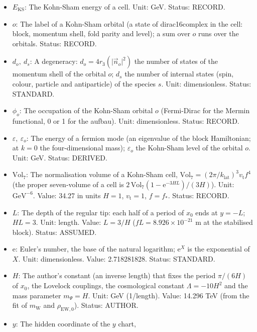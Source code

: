 \documentclass[
  10pt,
]{article}
\providecommand{\tightlist}{%
  \setlength{\itemsep}{0pt}\setlength{\parskip}{0pt}}
\begin{document}
\begin{itemize}
\tightlist
\item
  \(E_{\mathrm{KS}}\): The Kohn-Sham energy of a cell. Unit: GeV.
  Status: RECORD.
\item
  \(o\): The label of a Kohn-Sham orbital (a state of dirac16complex in
  the cell: block, momentum shell, fold parity and level); a sum over
  \(o\) runs over the orbitals. Status: RECORD.
\item
  \(d_o,\ d_s\): A degeneracy: \(d_o = 4r_3(\lvert\vec n_o\rvert^2)\)
  the number of states of the momentum shell of the orbital \(o\);
  \(d_s\) the number of internal states (spin, colour, particle and
  antiparticle) of the species \(s\). Unit: dimensionless. Status:
  STANDARD.
\item
  \(\phi_o\): The occupation of the Kohn-Sham orbital \(o\) (Fermi-Dirac
  for the Mermin functional, 0 or 1 for the aufbau). Unit:
  dimensionless. Status: RECORD.
\item
  \(\varepsilon,\ \varepsilon_o\): The energy of a fermion mode (an
  eigenvalue of the block Hamiltonian; at \(k = 0\) the four-dimensional
  mass); \(\varepsilon_o\) the Kohn-Sham level of the orbital \(o\).
  Unit: GeV. Status: DERIVED.
\item
  \(\mathrm{Vol}_7\): The normalisation volume of a Kohn-Sham cell,
  \(\mathrm{Vol}_7 = (2\pi/k_{\mathrm{lat}})^3v_{\mathrm{t}}f^4\) (the
  proper seven-volume of a cell is
  \(2\,\mathrm{Vol}_7(1 - \mathrm{e}^{-3HL})/(3H)\)). Unit:
  \(\mathrm{GeV}^{-6}\). Value: 34.27 in units \(H = 1\),
  \(v_{\mathrm{t}} = 1\), \(f = f_*\). Status: RECORD.
\item
  \(L\): The depth of the regular tip: each half of a period of \(x_0\)
  ends at \(y = -L\); \(HL = 3\). Unit: length. Value: \(L = 3/H\)
  (\(fL = 8.926\times10^{-21}\) m at the stabilised block). Status:
  ASSUMED.
\item
  \(\mathrm{e}\): Euler's number, the base of the natural logarithm;
  \(\mathrm{e}^{X}\) is the exponential of \(X\). Unit: dimensionless.
  Value: 2.718281828. Status: STANDARD.
\item
  \(H\): The author's constant (an inverse length) that fixes the period
  \(\pi/(6H)\) of \(x_0\), the Lovelock couplings, the cosmological
  constant \(\Lambda = -10H^2\) and the mass parameter \(m_\Psi = H\).
  Unit: GeV (1/length). Value: 14.296 TeV (from the fit of
  \(m_{\mathrm{W}}\) and \(\rho_{\mathrm{EW},0}\)). Status: AUTHOR.
\item
  \(y\): The hidden coordinate of the \(y\) chart,

\end{itemize}
\end{document}
